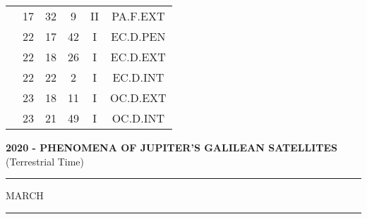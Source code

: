 \documentclass[12pt, a4paper]{article}
\begin{document}
\begin{multicols}{3}
{\begin{tabular}{c c c c c c}
	 	 	 	 & 17 & 32 & 9 & II & PA.F.EXT\\%
	 	 	 	 & 22 & 17 & 42 & I & EC.D.PEN\\%
	 	 	 	 & 22 & 18 & 26 & I & EC.D.EXT\\%
	 	 	 	 & 22 & 22 & 2 & I & EC.D.INT\\%
	 	 	 	 & 23 & 18 & 11 & I & OC.D.EXT\\%
	 	 	 	 & 23 & 21 & 49 & I & OC.D.INT\\%
	 	 \end{tabular}
 	}
\end{multicols}
\textbf{2020 - PHENOMENA OF JUPITER'S GALILEAN SATELLITES}\\(Terrestrial Time) 
\vspace{0.1cm} \hrule \vspace{0.1cm}
MARCH\vspace{0.1cm}
\hrule
\vspace{-0.2cm}
\end{document}
